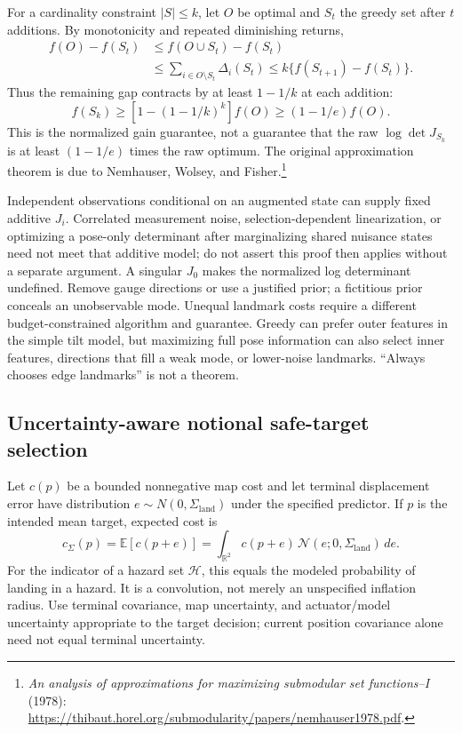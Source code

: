 For a cardinality constraint $|S|\leq k$, let $O$ be optimal and
$S_t$ the greedy set after $t$ additions. By monotonicity and repeated
diminishing returns,
\begin{align}
 f(O)-f(S_t)&\leq f(O\cup S_t)-f(S_t)\\
 &\leq\sum_{i\in O\setminus S_t}\Delta_i(S_t)
 \leq k\{f(S_{t+1})-f(S_t)\}.
\end{align}
Thus the remaining gap contracts by at least $1-1/k$ at each addition:
\begin{equation}
 f(S_k)\geq[1-(1-1/k)^k]f(O)\geq(1-1/e)f(O).
\end{equation}
This is the normalized gain guarantee, not a guarantee that the raw
$\log\det J_{S_k}$ is at least $(1-1/e)$ times the raw optimum.
The original approximation theorem is due to Nemhauser, Wolsey, and
Fisher.\footnote{\emph{An analysis of approximations for maximizing
submodular set functions--I} (1978):
\url{https://thibaut.horel.org/submodularity/papers/nemhauser1978.pdf}.}

Independent observations conditional on an augmented state can supply
fixed additive $J_i$. Correlated measurement noise, selection-dependent
linearization, or optimizing a pose-only determinant after marginalizing
shared nuisance states need not meet that additive model; do not assert
this proof then applies without a separate argument. A singular $J_0$
makes the normalized log determinant undefined. Remove gauge directions
or use a justified prior; a fictitious prior conceals an unobservable
mode. Unequal landmark costs require a different budget-constrained
algorithm and guarantee. Greedy can prefer outer features in the simple
tilt model, but maximizing full pose information can also select inner
features, directions that fill a weak mode, or lower-noise landmarks.
``Always chooses edge landmarks'' is not a theorem.

\subsection{Uncertainty-aware notional safe-target selection}

Let $c(p)$ be a bounded nonnegative map cost and let terminal displacement
error have distribution $e\sim N(0,\Sigma_{\mathrm{land}})$ under the
specified predictor. If $p$ is the intended mean target, expected cost is
\begin{equation}
 c_\Sigma(p)=\mathbb E[c(p+e)]
 =\int_{\mathbb R^2}c(p+e)\,
                      \mathcal N(e;0,\Sigma_{\mathrm{land}})\,de.
 \label{eq:expected-target-cost}
\end{equation}
For the indicator of a hazard set $\mathcal H$, this equals the modeled
probability of landing in a hazard. It is a convolution, not merely
an unspecified inflation radius. Use terminal covariance, map uncertainty,
and actuator/model uncertainty appropriate to the target decision;
current position covariance alone need not equal terminal uncertainty.

